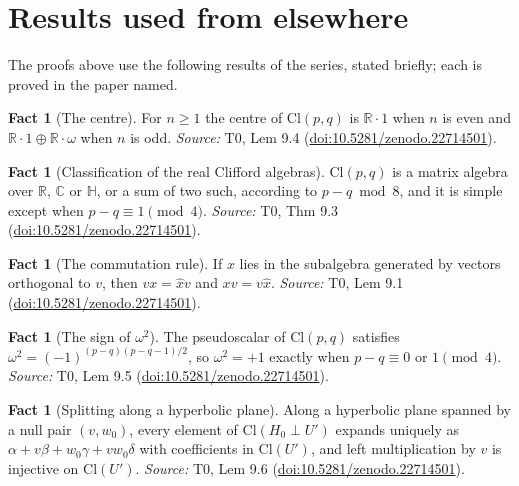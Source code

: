 \documentclass[11pt]{article}
\theoremstyle{definition}
\newtheorem{fact}[theorem]{Fact}
\theoremstyle{plain}
\providecommand{\C}{}\renewcommand{\C}{\mathbb{C}}
\providecommand{\Cl}{}\renewcommand{\Cl}{\mathrm{Cl}}
\providecommand{\HH}{}\renewcommand{\HH}{\mathbb{H}}
\providecommand{\R}{}\renewcommand{\R}{\mathbb{R}}
\begin{document}
\section{Results used from elsewhere}
The proofs above use the following results of the series, stated briefly; each is proved in the paper named.

\begin{fact}[The centre]\label{c:primer.centre}
For $n \geq 1$ the centre of $\Cl(p,q)$ is $\R \cdot 1$ when $n$ is even and $\R \cdot 1 \oplus \R \cdot \omega$ when $n$ is odd.
\emph{Source:} T0, Lem 9.4 (\href{https://doi.org/10.5281/zenodo.22714501}{doi:10.5281/zenodo.22714501}).
\end{fact}

\begin{fact}[Classification of the real Clifford algebras]\label{c:primer.classification-real-clifford-algebras}
$\Cl(p,q)$ is a matrix algebra over $\R$, $\C$ or $\HH$, or a sum of two such, according to $p - q \bmod 8$, and it is simple except when $p - q \equiv 1 \pmod 4$.
\emph{Source:} T0, Thm 9.3 (\href{https://doi.org/10.5281/zenodo.22714501}{doi:10.5281/zenodo.22714501}).
\end{fact}

\begin{fact}[The commutation rule]\label{c:primer.commutation-rule}
If $x$ lies in the subalgebra generated by vectors orthogonal to $v$, then $v x = \hat{x} v$ and $x v = v \hat{x}$.
\emph{Source:} T0, Lem 9.1 (\href{https://doi.org/10.5281/zenodo.22714501}{doi:10.5281/zenodo.22714501}).
\end{fact}

\begin{fact}[The sign of $\omega^2$]\label{c:primer.sign}
The pseudoscalar of $\Cl(p,q)$ satisfies $\omega^{2} = (-1)^{(p-q)(p-q-1)/2}$, so $\omega^{2} = +1$ exactly when $p - q \equiv 0$ or $1 \pmod 4$.
\emph{Source:} T0, Lem 9.5 (\href{https://doi.org/10.5281/zenodo.22714501}{doi:10.5281/zenodo.22714501}).
\end{fact}

\begin{fact}[Splitting along a hyperbolic plane]\label{c:primer.splitting-along-hyperbolic-plane}
Along a hyperbolic plane spanned by a null pair $(v, w_0)$, every element of $\Cl(H_0 \perp U')$ expands uniquely as $\alpha + v\beta + w_0\gamma + v w_0\delta$ with coefficients in $\Cl(U')$, and left multiplication by $v$ is injective on $\Cl(U')$.
\emph{Source:} T0, Lem 9.6 (\href{https://doi.org/10.5281/zenodo.22714501}{doi:10.5281/zenodo.22714501}).
\end{fact}
\end{document}
